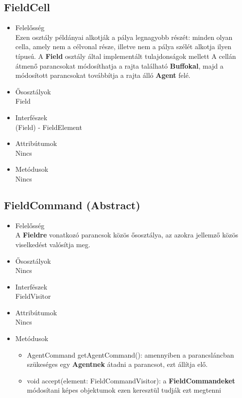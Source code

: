 \subsection{FieldCell}
\begin{itemize}

\item Felelősség\\
    Ezen osztály példányai alkotják a pálya legnagyobb részét: minden olyan cella, amely nem a célvonal része, illetve nem a pálya szélét alkotja ilyen típusú. A \textbf{Field} osztály által implementált tulajdonságok mellett A cellán átmenő parancsokat módosíthatja a rajta található
    \textbf{Buffokal}, majd a módosított parancsokat továbbítja a rajta álló \textbf{Agent} felé.

\item Ősosztályok\\
Field

\item Interfészek\\
(Field) - FieldElement

\item Attribútumok\\
Nincs

\item Metódusok\\
Nincs

\end{itemize}

\subsection{FieldCommand (Abstract)}
\begin{itemize}

\item Felelősség\\
    A \textbf{Fieldre} vonatkozó parancsok közös ősosztálya, az azokra jellemző közös viselkedést valósítja meg.

\item Ősosztályok\\
Nincs

\item Interfészek\\
FieldVisitor

\item Attribútumok\\
Nincs

\item Metódusok\\

\begin{itemize}
    \item AgentCommand getAgentCommand(): amennyiben a parancsláncban szükeséges egy \textbf{Agentnek} átadni a parancsot, ezt állítja elő.
    \item void accept(element: FieldCommandVisitor): a \textbf{FieldCommandeket} módosítani képes objektumok ezen keresztül tudják ezt megtenni\end{itemize}

\end{itemize}

